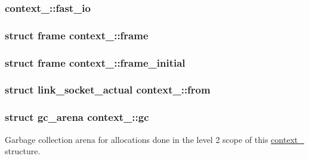 \subsubsection[{fast\+\_\+io}]{ context\+\_\+::fast\+\_\+io}\label{structcontext__2_ad8df4843172d7eaa3a83d407756f4d36}
\hypertarget{structcontext__2_a7bdb348860c0854ba0d834af8322c7d8}{}
\subsubsection[{frame}]{\setlength{\rightskip}{0pt plus 5cm}struct {\bf frame} context\+\_\+::frame}\label{structcontext__2_a7bdb348860c0854ba0d834af8322c7d8}
\hypertarget{structcontext__2_a1187d7900d4fcec429d30b7e5370d551}{}
\subsubsection[{frame\+\_\+initial}]{\setlength{\rightskip}{0pt plus 5cm}struct {\bf frame} context\+\_\+::frame\+\_\+initial}\label{structcontext__2_a1187d7900d4fcec429d30b7e5370d551}
\hypertarget{structcontext__2_a7c515ef01a7ece88dbcfa25129e47c9c}{}
\subsubsection[{from}]{\setlength{\rightskip}{0pt plus 5cm}struct {\bf link\+\_\+socket\+\_\+actual} context\+\_\+::from}\label{structcontext__2_a7c515ef01a7ece88dbcfa25129e47c9c}
\hypertarget{structcontext__2_ad4aeb5d46c4a32dc490a124af2c0770a}{}
\subsubsection[{gc}]{\setlength{\rightskip}{0pt plus 5cm}struct {\bf gc\+\_\+arena} context\+\_\+::gc}\label{structcontext__2_ad4aeb5d46c4a32dc490a124af2c0770a}
Garbage collection arena for allocations done in the level 2 scope of this \hyperlink{structcontext__2}{context\+\_} structure. \hypertarget{structcontext__2_a75335b0f54178e487959fcc0b5a367b6}{}
